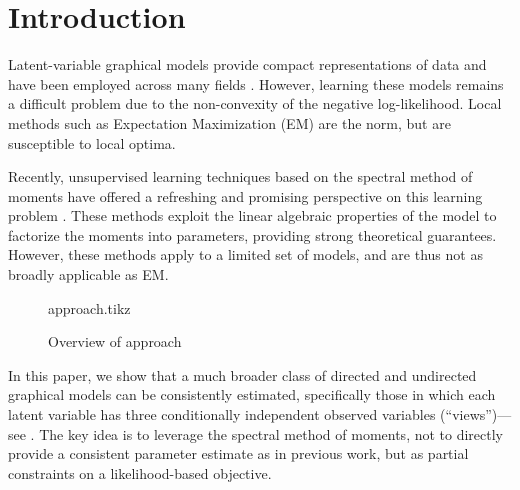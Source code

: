 \section{Introduction}
\label{sec:introduction}

Latent-variable graphical models provide compact representations of data
and have been employed across many fields 
\cite{quattoni04crf,beaumont2004bayesian,haghighi06prototype}.
However, learning these models remains a difficult problem due to the
non-convexity of the negative log-likelihood.  Local methods such as Expectation Maximization (EM)
are the norm, but are susceptible to local optima.

Recently, unsupervised learning techniques based on the spectral method of moments
have offered a refreshing and promising perspective on
this learning problem
\citep{hsu09spectral,anandkumar11tree,anandkumar12moments,anandkumar12lda,hsu12identifiability,balle11transducer,balle12automata}.
These methods exploit the linear algebraic properties of the model to
factorize the moments into parameters, providing strong theoretical guarantees.
However, these methods apply to a limited set of models, and are thus
not as broadly applicable as EM.

\begin{figure}[t]
  \label{fig:approach}
  \centering
  {approach.tikz}
  \caption{ Overview of approach}
\end{figure}


In this paper,
we show that a much broader class of directed and undirected graphical models can be consistently estimated,
specifically those in which each latent variable has three conditionally
independent observed variables (``views'')---see .
The key idea is to leverage the spectral method of moments,
not to directly provide a consistent parameter estimate as in previous work,
but as partial constraints on a likelihood-based objective.

